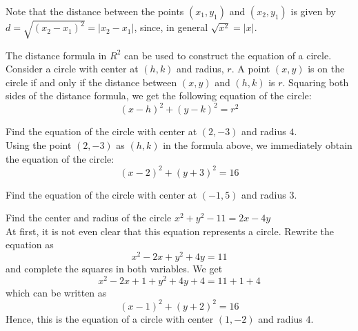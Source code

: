 \documentclass[handout]{ximera}
\begin{document}
\begin{image}
\end{image}
Note that the distance between the points $(x_1, y_1)$ and $(x_2, y_1)$ is given by 
$d = \sqrt{(x_2-x_1)^2} = |x_2 -x_1|$, since, in general $\sqrt{x^2} = |x|$.

The distance formula in $R^2$ can be used to construct the equation of a circle. Consider a circle with center at $(h,k)$ and radius, $r$.
A point $(x,y)$ is on the circle if and only if the distance between $(x,y)$ and $(h,k)$ is $r$. 
Squaring both sides of the distance formula, we get the following equation of the circle: 
\[
(x-h)^2 + (y-k)^2 = r^2
\]

\begin{example}
Find the equation of the circle with center at $(2, -3)$ and radius $4$.\\
Using the point $(2, -3)$ as $(h,k)$ in the formula above, we immediately obtain the equation of the circle:
\[
(x-2)^2 + (y+3)^2 = 16
\]
\end{example}

\begin{problem}
Find the equation of the circle with center at $(-1, 5)$ and radius $3$.
\end{problem}

\begin{example}
Find the center and radius of the circle $x^2 + y^2 -11 = 2x - 4y$\\
At first, it is not even clear that this equation represents a circle.  Rewrite the equation as
\[
x^2 - 2x + y^2 + 4y = 11
\]
and complete the squares in both variables. We get
\[
x^2 - 2x + 1 + y^2 + 4y + 4 = 11 + 1 + 4
\]
which can be written as 
\[
(x-1)^2 +(y+2)^2 = 16
\]
Hence, this is the equation of a circle with center $(1, -2)$ and radius $4$.
\end{example}
\end{document}
